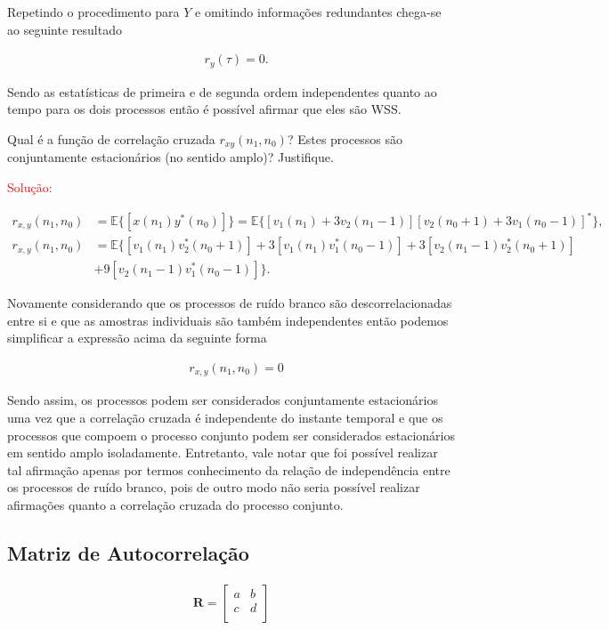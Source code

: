         Repetindo o procedimento para $Y$ e omitindo informações redundantes chega-se ao seguinte resultado
        
        \begin{align}
            &r_{y}(\tau) = 0.
        \end{align}
        
        Sendo as estatísticas de primeira e de segunda ordem independentes quanto ao tempo para os dois processos então é possível afirmar que eles são WSS.
    
     Qual é a função de correlação cruzada $r_{xy}(n_1,n_0)$? Estes processos são conjuntamente estacionários (no sentido amplo)? Justifique.
    
        \textcolor{red}{Solução:}
        
        \begin{align}
            r_{x,y}(n_{1},n_{0}) &= \mathbb{E}\{[x(n_{1})y^{*}(n_{0})]\} = \mathbb{E}\{[v_{1}(n_{1}) + 3v_{2}(n_{1}-1)][v_{2}(n_{0}+1) + 3v_{1}(n_{0}-1)]^{*}\}, \\
            r_{x,y}(n_{1},n_{0}) &= \mathbb{E}\{[v_{1}(n_{1})v^{*}_{2}(n_{0}+1)] + 3[v_{1}(n_{1})v^{*}_{1}(n_{0}-1)] + 3[v_{2}(n_{1}-1)v^{*}_{2}(n_{0}+1)] \\ 
            &+ 9[v_{2}(n_{1}-1)v^{*}_{1}(n_{0}-1)]\}.  
        \end{align}
        
        Novamente considerando que os processos de ruído branco são descorrelacionadas entre si e que as amostras individuais são também independentes então podemos simplificar a expressão acima da seguinte forma
        
        \begin{align}
            &r_{x,y}(n_{1},n_{0}) = 0 
        \end{align}
        
        Sendo assim, os processos podem ser considerados conjuntamente estacionários uma vez que a correlação cruzada é independente do instante temporal e que os processos que compoem o processo conjunto podem 
        ser considerados estacionários em sentido amplo isoladamente. Entretanto, vale notar que foi possível realizar tal afirmação apenas por termos conhecimento da relação de independência entre os processos 
        de ruído branco, pois de outro modo não seria possível realizar afirmações quanto a correlação cruzada do processo conjunto.
    

\subsection{Matriz de Autocorrelação} %
\begin{align}
    \mathbf{R} = \left[
    \begin{matrix}
        a & b  \\
        c & d  \\
    \end{matrix} \right]
\end{align}

